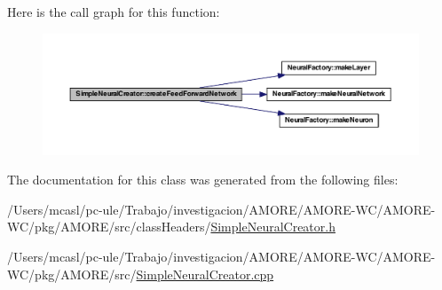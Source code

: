 Here is the call graph for this function:\nopagebreak
\begin{figure}[H]
\begin{center}
\leavevmode
\includegraphics[width=400pt]{class_simple_neural_creator_a02ea62733f819e7b4a0b9878910545c5_cgraph}
\end{center}
\end{figure}




The documentation for this class was generated from the following files:\begin{DoxyCompactItemize}
\item 
/Users/mcasl/pc-\/ule/Trabajo/investigacion/AMORE/AMORE-\/WC/AMORE-\/WC/pkg/AMORE/src/classHeaders/\hyperlink{_simple_neural_creator_8h}{SimpleNeuralCreator.h}\item 
/Users/mcasl/pc-\/ule/Trabajo/investigacion/AMORE/AMORE-\/WC/AMORE-\/WC/pkg/AMORE/src/\hyperlink{_simple_neural_creator_8cpp}{SimpleNeuralCreator.cpp}\end{DoxyCompactItemize}
